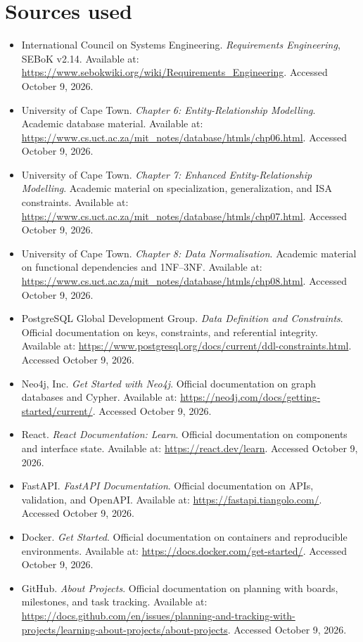 \documentclass[12pt,a4paper]{article}
\begin{document}
\section*{Sources used}
\begin{itemize}
\item International Council on Systems Engineering. \textit{Requirements Engineering}, SEBoK v2.14. Available at: \url{https://www.sebokwiki.org/wiki/Requirements_Engineering}. Accessed October 9, 2026.
\item University of Cape Town. \textit{Chapter 6: Entity-Relationship Modelling}. Academic database material. Available at: \url{https://www.cs.uct.ac.za/mit_notes/database/htmls/chp06.html}. Accessed October 9, 2026.
\item University of Cape Town. \textit{Chapter 7: Enhanced Entity-Relationship Modelling}. Academic material on specialization, generalization, and ISA constraints. Available at: \url{https://www.cs.uct.ac.za/mit_notes/database/htmls/chp07.html}. Accessed October 9, 2026.
\item University of Cape Town. \textit{Chapter 8: Data Normalisation}. Academic material on functional dependencies and 1NF--3NF. Available at: \url{https://www.cs.uct.ac.za/mit_notes/database/htmls/chp08.html}. Accessed October 9, 2026.
\item PostgreSQL Global Development Group. \textit{Data Definition and Constraints}. Official documentation on keys, constraints, and referential integrity. Available at: \url{https://www.postgresql.org/docs/current/ddl-constraints.html}. Accessed October 9, 2026.
\item Neo4j, Inc. \textit{Get Started with Neo4j}. Official documentation on graph databases and Cypher. Available at: \url{https://neo4j.com/docs/getting-started/current/}. Accessed October 9, 2026.
\item React. \textit{React Documentation: Learn}. Official documentation on components and interface state. Available at: \url{https://react.dev/learn}. Accessed October 9, 2026.
\item FastAPI. \textit{FastAPI Documentation}. Official documentation on APIs, validation, and OpenAPI. Available at: \url{https://fastapi.tiangolo.com/}. Accessed October 9, 2026.
\item Docker. \textit{Get Started}. Official documentation on containers and reproducible environments. Available at: \url{https://docs.docker.com/get-started/}. Accessed October 9, 2026.
\item GitHub. \textit{About Projects}. Official documentation on planning with boards, milestones, and task tracking. Available at: \url{https://docs.github.com/en/issues/planning-and-tracking-with-projects/learning-about-projects/about-projects}. Accessed October 9, 2026.
\end{itemize}
\end{document}

